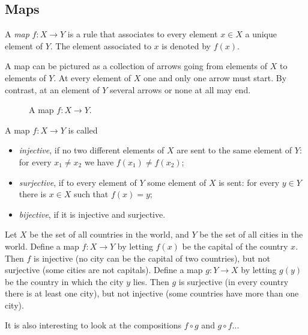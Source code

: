\begin{page}
\setcounter{section}{2}
\setcounter{subsection}{1}
\setcounter{dfn}{0}
\label{portion:28}

\subsection{Maps}
A \emph{map} $f \colon X \to Y$ is a rule that associates to every element $x \in X$ a unique element of $Y$.
The element associated to $x$ is denoted by $f(x)$.

A map can be pictured as a collection of arrows going from elements of $X$ to elements of $Y$.
At every element of $X$ one and only one arrow must start.
By contrast, at an element of $Y$ several arrows or none at all may end.

\begin{figure}[ht]
\begin{center}

\end{center}
\caption{A map $f \colon X \to Y$.}
\label{fig:Map}
\end{figure}

A map $f \colon X \to Y$ is called
\begin{itemize}
\item
\emph{injective}, if no two different elements of $X$ are sent to the same element of $Y$: for every $x_1 \ne x_2$ we have $f(x_1) \ne f(x_2)$;
\item
\emph{surjective}, if to every element of $Y$ some element of $X$ is sent: for every $y \in Y$ there is $x \in X$ such that $f(x) = y$;
\item
\emph{bijective}, if it is injective and surjective.
\end{itemize}


\end{page}

\begin{page}
\setcounter{section}{2}
\setcounter{subsection}{1}
\setcounter{dfn}{1}
\label{portion:30}

\begin{exl}
Let $X$ be the set of all countries in the world, and $Y$ be the set of all cities in the world.
Define a map $f \colon X \to Y$ by letting $f(x)$ be the capital of the country $x$.
Then $f$ is injective (no city can be the capital of two countries), but not surjective (some cities are not capitals).
Define a map $g \colon Y \to X$ by letting $g(y)$ be the country in which the city $y$ lies.
Then $g$ is surjective (in every country there is at least one city), but not injective (some countries have more than one city).

It is also interesting to look at the compositions $f \circ g$ and $g \circ f$...
\end{exl}

\end{page}

